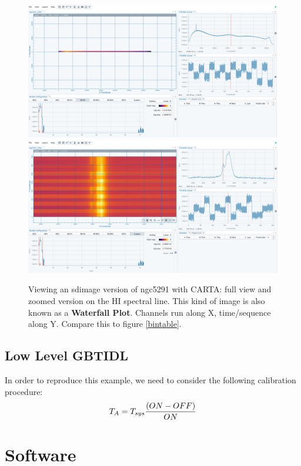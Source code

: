 \documentclass[12pt,a4paper]{article}
\begin{document}
\begin{figure}[h]
\centering
  \includegraphics[width=\textwidth]{ngc5291_2a.png}
  \includegraphics[width=\textwidth]{ngc5291_2b.png}
  \caption{\label{waterfall} Viewing an sdimage version of ngc5291 with CARTA:
    full view and zoomed version on the HI spectral line. This kind
    of image is also known as a {\bf Waterfall Plot}. Channels run along X, time/sequence along Y.
    Compare this to figure \ref{bintable}.}
\end{figure}

\subsection{Low Level GBTIDL}

In order to reproduce this example, we need to consider the following calibration procedure:
$$
T_A = T_{sys} { { (ON-OFF)} \over {ON} }
$$



\section{Software}
\end{document}
